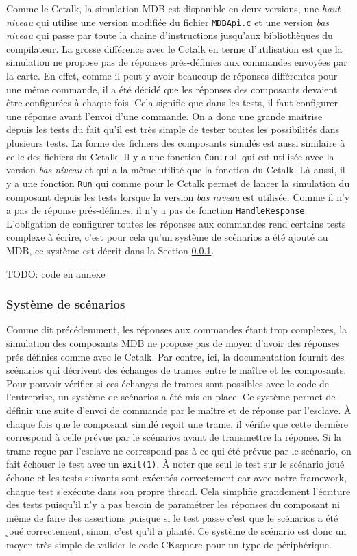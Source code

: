 \documentclass[a4paper]{article}
\begin{document}
Comme le Cctalk, la simulation MDB est disponible en deux versions, une
\textit{haut niveau} qui utilise une version modifiée du fichier \verb|MDBApi.c|
et une version \textit{bas niveau} qui passe par toute la chaine d'instructions
jusqu'aux bibliothèques du compilateur. La grosse différence avec le Cctalk en
terme d'utilisation est que la simulation ne propose pas de réponses
prés-définies aux commandes envoyées par la carte. En effet, comme il peut y
avoir beaucoup de réponses différentes pour une même commande, il a été décidé
que les réponses des composants devaient être configurées à chaque fois. Cela
signifie que dans les tests, il faut configurer une réponse avant l'envoi d'une
commande. On a donc une grande maitrise depuis les tests du fait qu'il est très
simple de tester toutes les possibilités dans plusieurs tests. La forme des
fichiers des composants simulés est aussi similaire à celle des fichiers du
Cctalk. Il y a une fonction \verb|Control| qui est utilisée avec la version
\textit{bas niveau} et qui a la même utilité que la fonction du Cctalk. Là
aussi, il y a une fonction \verb|Run| qui comme pour le Cctalk permet de lancer
la simulation du composant depuis les tests lorsque la version \textit{bas
niveau} est utilisée. Comme il n'y a pas de réponse prés-définies, il n'y a pas
de fonction \verb|HandleResponse|. L'obligation de configurer toutes les
réponses aux commandes rend certains tests complexe à écrire, c'est pour cela
qu'un système de scénarios a été ajouté au MDB, ce système est décrit dans la
Section \ref{sysscenar}.

TODO: code en annexe

\subsubsection{Système de scénarios}
\label{sysscenar}

Comme dit précédemment, les réponses aux commandes étant trop complexes, la
simulation des composants MDB ne propose pas de moyen d'avoir des réponses prés
définies comme avec le Cctalk. Par contre, ici, la documentation fournit des
scénarios qui décrivent des échanges de trames entre le maître et les
composants. Pour pouvoir vérifier si ces échanges de trames sont possibles avec
le code de l'entreprise, un système de scénarios a été mis en place. Ce système
permet de définir une suite d'envoi de commande par le maître et de réponse par
l'esclave. À chaque fois que le composant simulé reçoit une trame, il vérifie
que cette dernière correspond à celle prévue par le scénarios avant de
transmettre la réponse. Si la trame reçue par l'esclave ne correspond pas à ce
qui été prévue par le scénario, on fait échouer le test avec un \verb|exit(1)|.
À noter que seul le test sur le scénario joué échoue et les tests suivants sont
exécutés correctement car avec notre framework, chaque test s'exécute dans son
propre thread. Cela simplifie grandement l'écriture des tests puisqu'il n'y a
pas besoin de paramétrer les réponses du composant ni même de faire des
assertions puisque si le test passe c'est que le scénarios a été joué
correctement, sinon, c'est qu'il a planté. Ce système de scénario est donc un
moyen très simple de valider le code CKsquare pour un type de périphérique.
\end{document}

